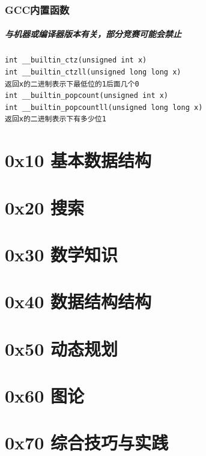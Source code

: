 \documentclass[UTF8]{article}
\begin{document}
\subsubsection{GCC内置函数}
\subparagraph{与机器或编译器版本有关，部分竞赛可能会禁止}

\begin{lstlisting}
int __builtin_ctz(unsigned int x)
int __builtin_ctzll(unsigned long long x)
返回x的二进制表示下最低位的1后面几个0
int __builtin_popcount(unsigned int x)
int __builtin_popcountll(unsigned long long x)
返回x的二进制表示下有多少位1
\end{lstlisting}


\section{0x10 基本数据结构}

\section{0x20 搜索}

\section{0x30 数学知识}

\section{0x40 数据结构结构}

\section{0x50 动态规划}

\section{0x60 图论}

\section{0x70 综合技巧与实践}
\end{document}
